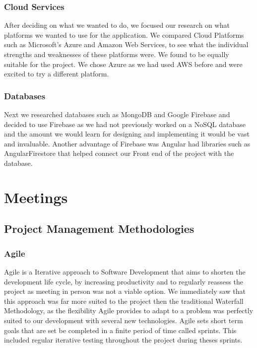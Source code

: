 \subsubsection{Cloud Services}
After deciding on what we wanted to do, we focused our research on what platforms we wanted to use for the application.  We compared Cloud Platforms such as Microsoft's Azure and Amazon Web Services, to see what the individual strengths and weaknesses of these platforms were. We found to be equally suitable for the project. We chose Azure as we had used AWS before and were excited to try a different platform.

\subsubsection{Databases}
Next we researched databases such as MongoDB and Google Firebase and decided to use Firebase as we had not previously worked on a NoSQL database and the amount we would learn for designing and implementing it would be vast and invaluable. Another advantage of Firebase was Angular had libraries such as AngularFirestore that helped connect our Front end of the project with the database.

 
 \section{Meetings}
 \subsection{Project Management Methodologies}
 \subsubsection{Agile}
  Agile is a Iterative approach to Software Development that aims to shorten the development life cycle, by increasing productivity and to regularly reassess the project as meeting in person was not a viable option. We immediately saw that this approach was far more suited to the project then the traditional Waterfall Methodology, as the flexibility Agile provides to adapt to a problem was perfectly suited to our development with several new technologies. Agile sets short term goals that are set be completed in a finite period of time called sprints. This included regular iterative testing throughout the project during theses sprints.
  
